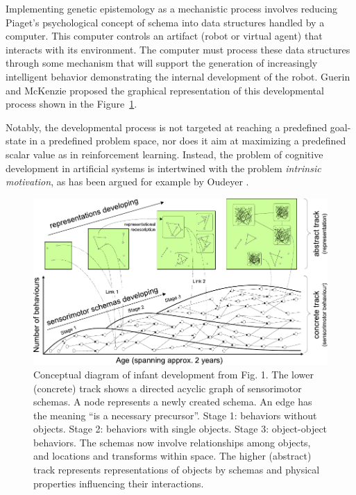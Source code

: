 \documentclass[runningheads]{llncs}
\begin{document}
Implementing genetic epistemology as a mechanistic process involves reducing Piaget's psychological concept of schema into data structures handled by a computer. 
This computer controls an artifact (robot or virtual agent) that interacts with its environment.
The computer must process these data structures through some mechanism that will support the generation of increasingly intelligent behavior demonstrating the internal development of the robot.
Guerin and McKenzie \cite{guerin_survey_2013} proposed the graphical representation of this developmental process shown in the Figure~\ref{fig:general}.

Notably, the developmental process is not targeted at reaching a predefined goal-state in a predefined problem space, nor does it aim at maximizing a predefined scalar value as in reinforcement learning.
Instead, the problem of cognitive development in artificial systems is intertwined with the problem \textit{intrinsic motivation}, as has been argued for example by  
Oudeyer \cite{oudeyer_intrinsic_2007}. 


\begin{figure}
	\includegraphics[width=\textwidth]{Figure_1_guerin.pdf}
	\caption{Conceptual diagram of infant development from \cite{guerin_survey_2013} Fig. 1.
	The lower (concrete) track shows a directed acyclic graph of sensorimotor schemas. 
	A node represents a newly created schema. 
	An edge has the meaning ``is a necessary precursor''. 
    Stage 1: behaviors without objects. 
    Stage 2: behaviors with single objects. 
    Stage 3: object-object behaviors. The schemas now involve relationships among objects, and locations and transforms within space.
    The higher (abstract) track represents representations of objects by schemas and physical properties influencing their interactions.} 
	\label{fig:general}
\end{figure}
\end{document}
